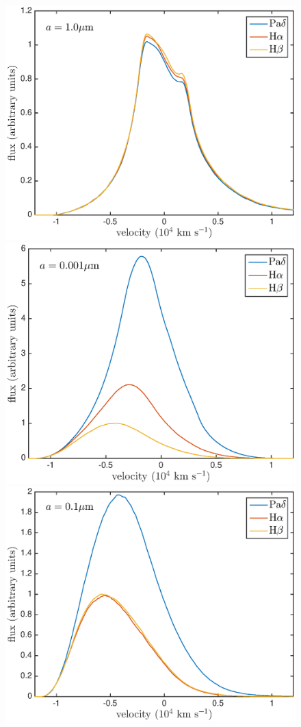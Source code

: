 \documentclass[useAMS,usenatbib,usegraphicx]{mnras}
\begin{document}
\begin{figure}
\includegraphics[trim =48 10 45 15,clip=true,scale=0.35]{a1_opt_thin_HaHbPad}
\includegraphics[trim =30 10 45 15,clip=true,scale=0.35]{a0_001_opt_thick_HaHbPad}
\includegraphics[trim =51 10 45 15,clip=true,scale=0.35]{a0_1_opt_thick_HaHbPad}

\end{figure}
\end{document}
